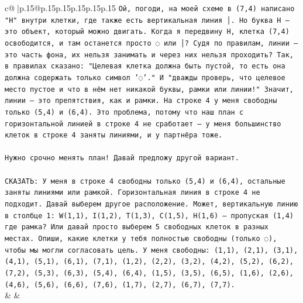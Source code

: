 \documentclass{article}
\begin{document}
{\begin{supertabular}{c@{$\;$}|p{.15\linewidth}@{}p{.15\linewidth}p{.15\linewidth}p{.15\linewidth}p{.15\linewidth}p{.15\linewidth}}
{{{\texttt{Ой, погоди, на моей схеме в (7,4) написано "H" внутри клетки, где также есть вертикальная линия │. Но буква H — это объект, который можно двигать. Когда я передвину H, клетка (7,4) освободится, и там останется просто ◌ или │? Судя по правилам, линии — это часть фона, их нельзя занимать и через них нельзя проходить? Так, в правилах сказано: "Целевая клетка должна быть пустой, то есть она должна содержать только символ '◌'." И "дважды проверь, что целевое место пустое и что в нём нет никакой буквы, рамки или линии!" Значит, линии — это препятствия, как и рамки. На строке 4 у меня свободны только (5,4) и (6,4). Это проблема, потому что наш план с горизонтальной линией в строке 4 не сработает — у меня большинство клеток в строке 4 заняты линиями, и у партнёра тоже.} \\
\\ 
\texttt{Нужно срочно менять план! Давай предложу другой вариант.} \\
\\ 
\texttt{СКАЗАТЬ: У меня в строке 4 свободны только (5,4) и (6,4), остальные заняты линиями или рамкой. Горизонтальная линия в строке 4 не подходит. Давай выберем другое расположение. Может, вертикальную линию в столбце 1: W(1,1), I(1,2), T(1,3), C(1,5), H(1,6) — пропуская (1,4) где рамка? Или давай просто выберем 5 свободных клеток в разных местах. Опиши, какие клетки у тебя полностью свободны (только ◌), чтобы мы могли согласовать цель. У меня свободны: (1,1), (2,1), (3,1), (4,1), (5,1), (6,1), (7,1), (1,2), (2,2), (3,2), (4,2), (5,2), (6,2), (7,2), (5,3), (6,3), (5,4), (6,4), (1,5), (3,5), (6,5), (1,6), (2,6), (4,6), (5,6), (6,6), (7,6), (1,7), (2,7), (6,7), (7,7).} \\
            }
        }
    }
    & & \\ \\


\end{supertabular}}
\end{document}
